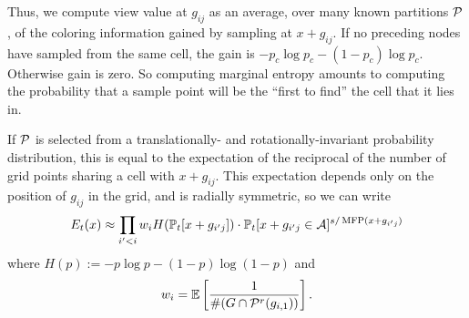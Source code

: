 Thus, we compute view value at $g_{ij}$ as an average, over many known partitions  $\P$,
of the coloring information gained by sampling at $x+g_{ij}$.
If no preceding nodes have sampled from the same cell, the gain is
$-p_c\log p_c - (1-p_c)\log p_c$.  Otherwise gain is zero.
So computing marginal entropy amounts to computing the probability that a
sample point will be the ``first to find'' the cell that it lies in.

If $\P$ is selected from a translationally- and rotationally-invariant probability distribution,
this is equal to the expectation of the reciprocal of the number of grid points sharing a cell with $x+g_{ij}$.  
This expectation depends only on the position of $g_{ij}$ in the grid, and is radially symmetric, so we can write
\begin{align}
 E_t(x) \approx \prod_{i\1<i} w_i H(\PP_t[x+g_{i\1j}])\cdot\PP_t[x+g_{i\1j}\in\A]^{s/\operatorname{MFP}(x+g_{i\1j})}
\label{eq: cell value}
\end{align}
where $H(p):=-p\log p - (1-p)\log(1-p)$ and
\begin{equation}
w_i = \EE\left[\frac{1}{\#(G\cap\P^r(g_{i,1}))}\right].
\end{equation}

